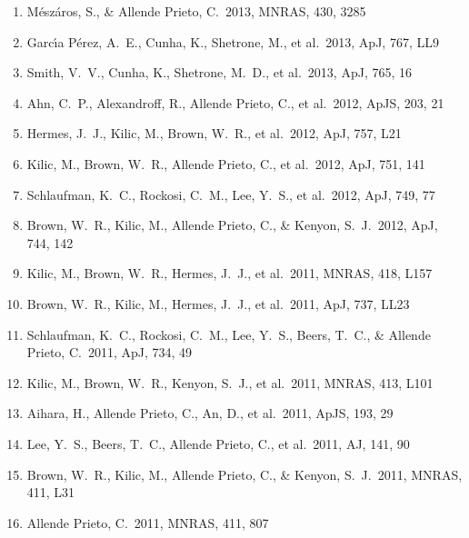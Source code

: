\documentclass[12pt]{article}
\begin{document}
\begin{enumerate}
\item M{\'e}sz{\'a}ros, S., \& Allende Prieto, C.\ 2013, MNRAS, 430, 3285 


\item
Garc{\'{\i}}a P{\'e}rez, A.~E., Cunha, K., Shetrone, M., et al.\ 2013, 
ApJ, 767, LL9 


\item Smith, V.~V., Cunha, K., 
Shetrone, M.~D., et al.\ 2013, ApJ, 765, 16 


\item Ahn, C.~P., Alexandroff, 
R., Allende Prieto, C., et al.\ 2012, ApJS, 203, 21 


\item Hermes, J.~J., Kilic, 
M., Brown, W.~R., et al.\ 2012, ApJ, 757, L21 


\item Kilic, M., Brown, W.~R., 
Allende Prieto, C., et al.\ 2012, ApJ, 751, 141 


\item Schlaufman, K.~C., 
Rockosi, C.~M., Lee, Y.~S., et al.\ 2012, ApJ, 749, 77 


\item Brown, W.~R., Kilic, M., 
Allende Prieto, C., \& Kenyon, S.~J.\ 2012, ApJ, 744, 142 


\item Kilic, M., Brown, W.~R., 
Hermes, J.~J., et al.\ 2011, MNRAS, 418, L157 


\item Brown, W.~R., Kilic, M., 
Hermes, J.~J., et al.\ 2011, ApJ, 737, LL23 


\item Schlaufman, K.~C., 
Rockosi, C.~M., Lee, Y.~S., Beers, T.~C., 
\& Allende Prieto, C.\ 2011, ApJ, 734, 49 


\item Kilic, M., Brown, W.~R., 
Kenyon, S.~J., et al.\ 2011, MNRAS, 413, L101 


\item Aihara, H., Allende 
Prieto, C., An, D., et al.\ 2011, ApJS, 193, 29 


\item Lee, Y.~S., Beers, T.~C., 
Allende Prieto, C., et al.\ 2011, AJ, 141, 90 


\item Brown, W.~R., Kilic, M., 
Allende Prieto, C., \& Kenyon, S.~J.\ 2011, MNRAS, 411, L31 


\item Allende Prieto, C.\ 
2011, MNRAS, 411, 807 



\end{enumerate}
\end{document}
